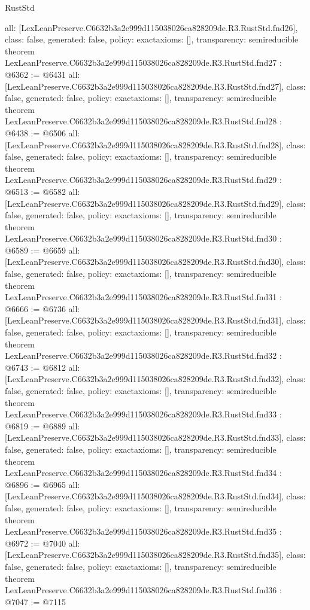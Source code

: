 \begin{lexlean}{RustStd}
\begin{coremodule}
{  all: [LexLeanPreserve.C6632b3a2e999d115038026ca828209de.R3.RustStd.fnd26],
  class: false,
  generated: false,
  policy: exact{axioms: []},
  transparency: semireducible
}
theorem LexLeanPreserve.C6632b3a2e999d115038026ca828209de.R3.RustStd.fnd27 : @6362 := @6431 {
  all: [LexLeanPreserve.C6632b3a2e999d115038026ca828209de.R3.RustStd.fnd27],
  class: false,
  generated: false,
  policy: exact{axioms: []},
  transparency: semireducible
}
theorem LexLeanPreserve.C6632b3a2e999d115038026ca828209de.R3.RustStd.fnd28 : @6438 := @6506 {
  all: [LexLeanPreserve.C6632b3a2e999d115038026ca828209de.R3.RustStd.fnd28],
  class: false,
  generated: false,
  policy: exact{axioms: []},
  transparency: semireducible
}
theorem LexLeanPreserve.C6632b3a2e999d115038026ca828209de.R3.RustStd.fnd29 : @6513 := @6582 {
  all: [LexLeanPreserve.C6632b3a2e999d115038026ca828209de.R3.RustStd.fnd29],
  class: false,
  generated: false,
  policy: exact{axioms: []},
  transparency: semireducible
}
theorem LexLeanPreserve.C6632b3a2e999d115038026ca828209de.R3.RustStd.fnd30 : @6589 := @6659 {
  all: [LexLeanPreserve.C6632b3a2e999d115038026ca828209de.R3.RustStd.fnd30],
  class: false,
  generated: false,
  policy: exact{axioms: []},
  transparency: semireducible
}
theorem LexLeanPreserve.C6632b3a2e999d115038026ca828209de.R3.RustStd.fnd31 : @6666 := @6736 {
  all: [LexLeanPreserve.C6632b3a2e999d115038026ca828209de.R3.RustStd.fnd31],
  class: false,
  generated: false,
  policy: exact{axioms: []},
  transparency: semireducible
}
theorem LexLeanPreserve.C6632b3a2e999d115038026ca828209de.R3.RustStd.fnd32 : @6743 := @6812 {
  all: [LexLeanPreserve.C6632b3a2e999d115038026ca828209de.R3.RustStd.fnd32],
  class: false,
  generated: false,
  policy: exact{axioms: []},
  transparency: semireducible
}
theorem LexLeanPreserve.C6632b3a2e999d115038026ca828209de.R3.RustStd.fnd33 : @6819 := @6889 {
  all: [LexLeanPreserve.C6632b3a2e999d115038026ca828209de.R3.RustStd.fnd33],
  class: false,
  generated: false,
  policy: exact{axioms: []},
  transparency: semireducible
}
theorem LexLeanPreserve.C6632b3a2e999d115038026ca828209de.R3.RustStd.fnd34 : @6896 := @6965 {
  all: [LexLeanPreserve.C6632b3a2e999d115038026ca828209de.R3.RustStd.fnd34],
  class: false,
  generated: false,
  policy: exact{axioms: []},
  transparency: semireducible
}
theorem LexLeanPreserve.C6632b3a2e999d115038026ca828209de.R3.RustStd.fnd35 : @6972 := @7040 {
  all: [LexLeanPreserve.C6632b3a2e999d115038026ca828209de.R3.RustStd.fnd35],
  class: false,
  generated: false,
  policy: exact{axioms: []},
  transparency: semireducible
}
theorem LexLeanPreserve.C6632b3a2e999d115038026ca828209de.R3.RustStd.fnd36 : @7047 := @7115 {
}
\end{coremodule}
\end{lexlean}
